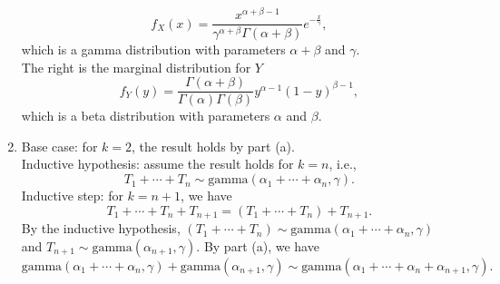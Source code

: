 \documentclass[12pt]{article}
\newenvironment{problem}[2][Problem]{\begin{trivlist}
\item[\hskip \labelsep {\bfseries #1}\hskip \labelsep {\bfseries #2.}]}
{\end{trivlist}}
\begin{document}
\begin{problem}{8}
\begin{enumerate}
    \[
      f_X (x) = \frac{x^{\alpha + \beta - 1}}{\gamma^{\alpha + \beta} \Gamma(\alpha + \beta)} e^{-\frac{x}{\gamma}},
    \]
    which is a gamma distribution with parameters $\alpha + \beta$ and $\gamma$.\\
    The right is the marginal distribution for $Y$
    \[
      f_Y (y) = \frac{\Gamma(\alpha + \beta)}{\Gamma(\alpha) \Gamma(\beta)} y^{\alpha - 1} (1 - y)^{\beta - 1},
    \]
    which is a beta distribution with parameters $\alpha$ and $\beta$.
    \item Base case: for $k = 2$, the result holds by part (a).\\
    Inductive hypothesis: assume the result holds for $k = n$, i.e.,
    \[
      T_1 + \cdots + T_n \sim 
      \text{gamma}(\alpha_1 + \cdots + \alpha_n, \gamma).
    \]
    Inductive step: for $k = n + 1$, we have
    \[
      T_1+ \cdots + T_n + T_{n+1} = (T_1 + \cdots + T_n) + T_{n+1}.
    \]
    By the inductive hypothesis, $(T_1 + \cdots + T_n) \sim 
    \text{gamma}(\alpha_1 + \cdots + \alpha_n, \gamma)$ and 
    $T_{n+1} \sim \text{gamma}(\alpha_{n+1}, \gamma)$.
    By part (a), we have 
    \[
      \text{gamma}(\alpha_1 + \cdots + \alpha_n, \gamma) 
      + \text{gamma}(\alpha_{n+1}, \gamma) 
      \sim 
      \text{gamma}(\alpha_1 + \cdots + \alpha_n + \alpha_{n+1}, \gamma).
    \]
  \end{enumerate}
\end{problem}

\end{document}

